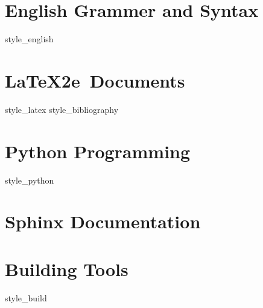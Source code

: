\documentclass[twoside]{book}
\begin{document}
\chapter{English Grammer and Syntax}
{style_english}

\chapter{\LaTeX2e\ Documents}
{style_latex}
{style_bibliography}

\chapter{Python Programming}
{style_python}

\chapter{Sphinx Documentation}

\chapter{Building Tools}
{style_build}

\printbibliography


\backmatter
\end{document}
